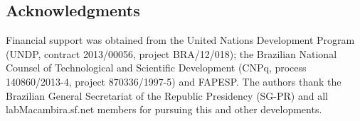\documentclass[a4paper, 11pt]{article} %
\begin{document}
\subsection*{Acknowledgments}
Financial support was obtained from the United Nations Development Program (UNDP, contract 2013/00056, project BRA/12/018);
the Brazilian National Counsel of Technological and Scientific Development (CNPq, process 140860/2013-4, project 870336/1997-5) and FAPESP. The authors thank the Brazilian General Secretariat of the Republic Presidency (SG-PR) and all labMacambira.sf.net members for pursuing this and other developments.

%
%
\end{document}
